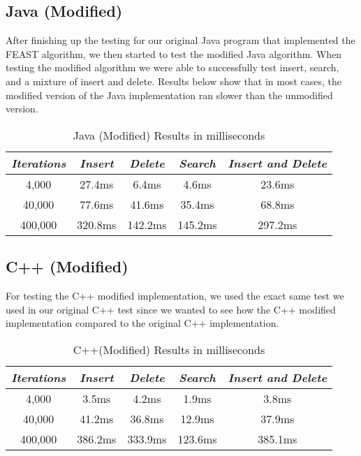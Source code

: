 \documentclass[conference]{IEEEtran}
\begin{document}
\subsection{Java (Modified)}\label{AA}
After finishing up the testing for our original Java program that implemented the FEAST algorithm, we then started to test the modified Java algorithm. When testing the modified algorithm we were able to successfully test insert, search, and a mixture of insert and delete. Results below show that in most cases, the modified version of the Java implementation ran slower than the unmodified version.

\begin{table}[htbp]
\caption{Java (Modified) Results in milliseconds}
\begin{center}
\begin{tabular}{|c|c|c|c|c|}
\hline
\cline{2-6} 
\textbf{\textit{Iterations}}& \textbf{\textit{Insert}}& \textbf{\textit{Delete}}& \textbf{\textit{Search}}& \textbf{\textit{Insert and Delete}}\\
\hline
4,000& 27.4ms& 6.4ms& 4.6ms& 23.6ms  \\
\hline
40,000& 77.6ms& 41.6ms& 35.4ms& 68.8ms \\
\hline
400,000& 320.8ms& 142.2ms& 145.2ms& 297.2ms \\
\hline
\end{tabular}
\label{tab1}
\end{center}
\end{table}

\subsection{C++ (Modified)}\label{AA}
For testing the C++ modified implementation, we used the exact same test we used in our original C++ test since we wanted to see how the C++ modified implementation compared to the original C++ implementation. 

\begin{table}[htbp]
\caption{C++(Modified) Results in milliseconds}
\begin{center}
\begin{tabular}{|c|c|c|c|c|}
\hline
\cline{2-6} 
\textbf{\textit{Iterations}}& \textbf{\textit{Insert}}& \textbf{\textit{Delete}}& \textbf{\textit{Search}}& \textbf{\textit{Insert and Delete}}\\
\hline
4,000& 3.5ms& 4.2ms& 1.9ms& 3.8ms  \\
\hline
40,000& 41.2ms& 36.8ms& 12.9ms& 37.9ms  \\
\hline
400,000& 386.2ms& 333.9ms& 123.6ms& 385.1ms \\
\hline
\end{tabular}
\label{tab1}
\end{center}
\end{table}
\end{document}
